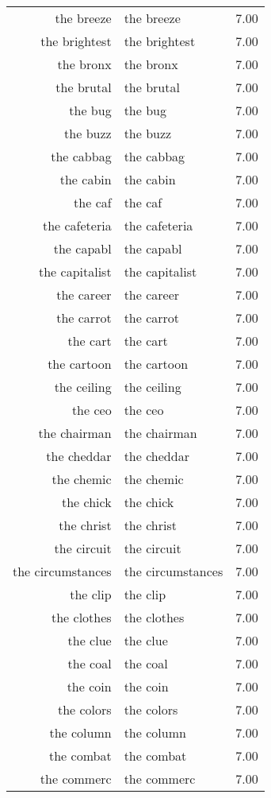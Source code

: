 \begin{table}[ht]
\begin{tabular}{rlr}
  the breeze & the breeze & 7.00 \\ 
  the brightest & the brightest & 7.00 \\ 
  the bronx & the bronx & 7.00 \\ 
  the brutal & the brutal & 7.00 \\ 
  the bug & the bug & 7.00 \\ 
  the buzz & the buzz & 7.00 \\ 
  the cabbag & the cabbag & 7.00 \\ 
  the cabin & the cabin & 7.00 \\ 
  the caf & the caf & 7.00 \\ 
  the cafeteria & the cafeteria & 7.00 \\ 
  the capabl & the capabl & 7.00 \\ 
  the capitalist & the capitalist & 7.00 \\ 
  the career & the career & 7.00 \\ 
  the carrot & the carrot & 7.00 \\ 
  the cart & the cart & 7.00 \\ 
  the cartoon & the cartoon & 7.00 \\ 
  the ceiling & the ceiling & 7.00 \\ 
  the ceo & the ceo & 7.00 \\ 
  the chairman & the chairman & 7.00 \\ 
  the cheddar & the cheddar & 7.00 \\ 
  the chemic & the chemic & 7.00 \\ 
  the chick & the chick & 7.00 \\ 
  the christ & the christ & 7.00 \\ 
  the circuit & the circuit & 7.00 \\ 
  the circumstances & the circumstances & 7.00 \\ 
  the clip & the clip & 7.00 \\ 
  the clothes & the clothes & 7.00 \\ 
  the clue & the clue & 7.00 \\ 
  the coal & the coal & 7.00 \\ 
  the coin & the coin & 7.00 \\ 
  the colors & the colors & 7.00 \\ 
  the column & the column & 7.00 \\ 
  the combat & the combat & 7.00 \\ 
  the commerc & the commerc & 7.00 \\ 

\end{tabular}
\end{table}
